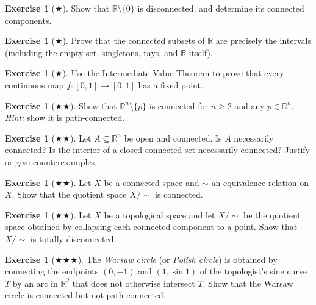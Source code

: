 \documentclass[11pt,a4paper,twoside]{book}
\theoremstyle{remark}
\theoremstyle{definition}
\newtheorem{exerciseplain}[theorem]{Exercise}
\theoremstyle{definition}
\newenvironment{exercise}[1][]{%
  \begin{exerciseplain}[#1]
}{%
  \end{exerciseplain}
}
\begin{document}
\begin{exercise}[$\bigstar$]\label{exo:connected-R-minus-point}
Show that $\mathbb{R}\setminus\{0\}$ is disconnected, and determine
its connected components.
\end{exercise}

\begin{exercise}[$\bigstar$]\label{exo:connected-subsets-R}
Prove that the connected subsets of $\mathbb{R}$ are precisely the
intervals (including the empty set, singletons, rays, and
$\mathbb{R}$ itself).
\end{exercise}

\begin{exercise}[$\bigstar$]\label{exo:fixed-point-interval}
Use the Intermediate Value Theorem to prove that every continuous
map $f\colon[0,1]\to[0,1]$ has a fixed point.
\end{exercise}

\begin{exercise}[$\bigstar\bigstar$]\label{exo:connected-complement-Rn}
Show that $\mathbb{R}^n\setminus\{p\}$ is connected for $n\ge 2$
and any $p\in\mathbb{R}^n$.  \textit{Hint:} show it is
path-connected.
\end{exercise}

\begin{exercise}[$\bigstar\bigstar$]\label{exo:closure-interior-connected}
Let $A\subseteq\mathbb{R}^n$ be open and connected.  Is
$\overline{A}$ necessarily connected?  Is the interior of a closed
connected set necessarily connected?  Justify or give counterexamples.
\end{exercise}

\begin{exercise}[$\bigstar\bigstar$]\label{exo:connected-quotient}
Let $X$ be a connected space and $\sim$ an equivalence relation
on $X$.  Show that the quotient space $X/{\sim}$ is connected.
\end{exercise}

\begin{exercise}[$\bigstar\bigstar$]\label{exo:components-totally-disconnected}
Let $X$ be a topological space and let $X/{\sim}$ be the quotient
space obtained by collapsing each connected component to a point.
Show that $X/{\sim}$ is totally disconnected.
\end{exercise}

\begin{exercise}[$\bigstar\bigstar\bigstar$]\label{exo:polish-circle}
The \emph{Warsaw circle} (or \emph{Polish circle}) is obtained by
connecting the endpoints $(0,-1)$ and $(1,\sin 1)$ of the topologist's
sine curve $T$ by an arc in $\mathbb{R}^2$ that does not otherwise
intersect $T$.  Show that the Warsaw circle is connected but not
path-connected.
\end{exercise}
\end{document}

